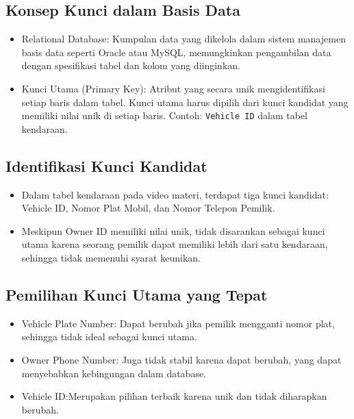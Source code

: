 \documentclass{article}
\begin{document}
\subsection{Konsep Kunci dalam Basis Data}
\begin{itemize}
    \item Relational Database: Kumpulan data yang dikelola dalam sistem manajemen basis data seperti Oracle atau MySQL, memungkinkan pengambilan data dengan spesifikasi tabel dan kolom yang diinginkan.
    \item Kunci Utama (Primary Key): Atribut yang secara unik mengidentifikasi setiap baris dalam tabel. Kunci utama harus dipilih dari kunci kandidat yang memiliki nilai unik di setiap baris. Contoh: \texttt{Vehicle ID} dalam tabel kendaraan.
\end{itemize}

\subsection{Identifikasi Kunci Kandidat}
\begin{itemize}
    \item Dalam tabel kendaraan pada video materi, terdapat tiga kunci kandidat: Vehicle ID, Nomor Plat Mobil, dan Nomor Telepon Pemilik.
    \item Meskipun Owner ID memiliki nilai unik, tidak disarankan sebagai kunci utama karena seorang pemilik dapat memiliki lebih dari satu kendaraan, sehingga tidak memenuhi syarat keunikan.
\end{itemize}

\subsection{Pemilihan Kunci Utama yang Tepat}
\begin{itemize}
    \item Vehicle Plate Number: Dapat berubah jika pemilik mengganti nomor plat, sehingga tidak ideal sebagai kunci utama.
    \item Owner Phone Number: Juga tidak stabil karena dapat berubah, yang dapat menyebabkan kebingungan dalam database.
    \item Vehicle ID:\@ Merupakan pilihan terbaik karena unik dan tidak diharapkan berubah.
\end{itemize}
\end{document}
